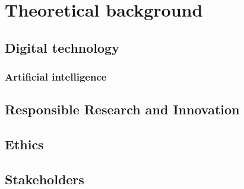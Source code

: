 \section{Theoretical background}
\label{sec:background}

\subsection{Digital technology}
\subsubsection{Artificial intelligence}

\subsection{Responsible Research and Innovation}

\subsection{Ethics}

\subsection{Stakeholders}

